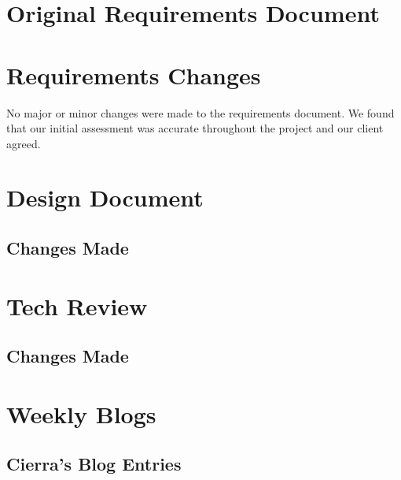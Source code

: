 \documentclass[compsoc,draftclsnofoot,onecolumn,10pt]{IEEEtran}
\begin{document}
\section{Original Requirements Document}

% 


\section{Requirements Changes}

No major or minor changes were made to the requirements document. We found that our initial assessment was accurate throughout the project and our client agreed.
% 


\section{Design Document}
    \subsection{Changes Made}
    

\section{Tech Review}

    \subsection{Changes Made}
    

\section{Weekly Blogs}

\subsection{Cierra's Blog Entries}
\end{document}
